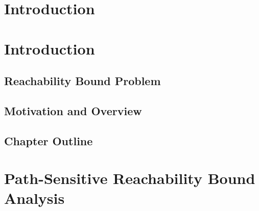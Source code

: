 \documentclass[12pt, letterpaper]{report}   %
\begin{document}

\newpage
\endofprelim
\cleardoublepage





\chapter{Introduction}
\label{introduction}
% 
\clearpage


\chapter*{}

\chapter{Introduction}
\label{sec:reachability-intro}
\section{Reachability Bound Problem}
\label{sec:reachability-background}

\section{Motivation and Overview}
\label{sec:reachability-motivation}

\section{Chapter Outline}
\label{sec:reachability-outline}

\chapter{Path-Sensitive Reachability Bound Analysis}
\label{sec:reachability-analysis}
\end{document}
